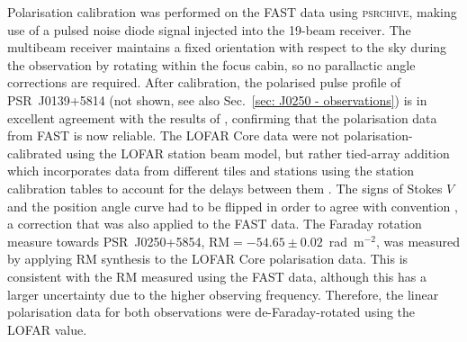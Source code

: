 Polarisation calibration was performed on the FAST data using \textsc{psrchive}, making use of a pulsed noise diode signal injected into the 19-beam receiver. The multibeam receiver maintains a fixed orientation with respect to the sky during the observation by rotating within the focus cabin, so no parallactic angle corrections are required. After calibration, the polarised pulse profile of PSR~J0139+5814 (not shown, see also Sec.~\ref{sec: J0250 - observations}) is in excellent agreement with the results of \citet[publicly available on the European Pulsar Network (EPN) database\footnote{\url{http://www.epta.eu.org/epndb/}}]{GLxx1998}, confirming that the polarisation data from FAST is now reliable. The LOFAR Core data were not polarisation-calibrated using the LOFAR station beam model, but rather tied-array addition which incorporates data from different tiles and stations using the station calibration tables to account for the delays between them \citep[more detail can be found in ][]{SBG+2019}. The signs of Stokes $V$ and the position angle curve had to be flipped in order to agree with convention \citep[e.g.][see also Sec.~\ref{sec: intro - emission models - polarisation - conventions}]{EWxx2001}, a correction that was also applied to the FAST data. The Faraday rotation measure towards PSR~J0250+5854, $\mathrm{RM}=-54.65\pm0.02$~rad~m$^{-2}$, was measured by applying RM synthesis \citep{BBxx2005} to the LOFAR Core polarisation data. This is consistent with the RM measured using the FAST data, although this has a larger uncertainty due to the higher observing frequency. Therefore, the linear polarisation data for both observations were de-Faraday-rotated using the LOFAR value.

